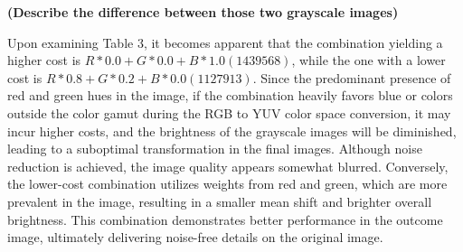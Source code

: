 \documentclass[a4paper, 12pt]{article}
\begin{document}
\begin{center}
    \textbf{(Describe the difference between those two grayscale images)}
\end{center}

Upon examining Table 3, it becomes apparent that the combination yielding a higher cost is $R*0.0+G*0.0+B*1.0 (1439568)$, while the one with a lower cost is $R*0.8+G*0.2+B*0.0(1127913)$. Since the predominant presence of red and green hues in the image, if the combination heavily favors blue or colors outside the color gamut during the RGB to YUV color space conversion, it may incur higher costs, and the brightness of the grayscale images will be diminished, leading to a suboptimal transformation in the final images. Although noise reduction is achieved, the image quality appears somewhat blurred. Conversely, the lower-cost combination utilizes weights from red and green, which are more prevalent in the image, resulting in a smaller mean shift and brighter overall brightness. This combination demonstrates better performance in the outcome image, ultimately delivering noise-free details on the original image.
\end{document}
